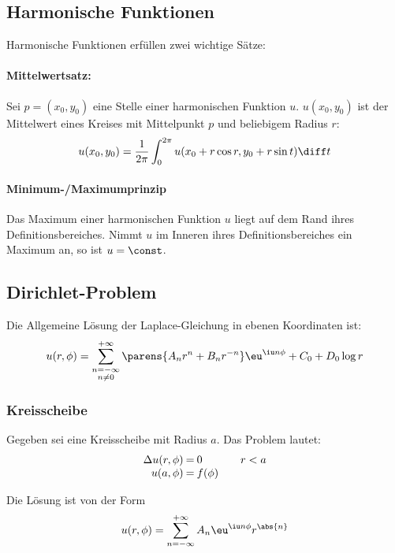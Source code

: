 	\subsection{Harmonische Funktionen} %
		Harmonische Funktionen erfüllen zwei wichtige Sätze:
		
		\paragraph{Mittelwertsatz:} %
			Sei $p = (x_0,y_0)$ eine Stelle einer harmonischen Funktion $u$.
			$u(x_0,y_0)$ ist der Mittelwert eines Kreises mit Mittelpunkt $p$ und
			beliebigem Radius $r$:
			\[
				u(x_0, y_0) = \frac{1}{2\pi} \int_0^{2\pi} u(x_0 + r\cos r, y_0 + r\sin t) \diff t
			\]
		
		\paragraph{Minimum-/Maximumprinzip} %
			Das Maximum einer harmonischen Funktion $u$ liegt auf dem Rand ihres
			Definitionsbereiches. Nimmt $u$ im Inneren ihres Definitionsbereiches
			ein Maximum an, so ist $u = \const$.
	\subsection{Dirichlet-Problem} %
		Die Allgemeine Lösung der Laplace-Gleichung in ebenen Koordinaten ist:
		\[
			u(r,\phi) = \sum_{\substack{n=-\infty\\ n\neq 0}}^{+\infty} \parens{
				A_n r^n + B_n r^{-n}
			} \eu^{\iu n \phi} + C_0 + D_0 \log r
		\]
		\subsubsection{Kreisscheibe} %
			Gegeben sei eine Kreisscheibe mit Radius $a$.
			Das Problem lautet:
			\begin{equation*}
				\begin{array}{r@{\:=\:}l@{\qquad}l}
					\Delta u(r,\phi) & 0 & r < a \\
					u(a,\phi) & f(\phi) & 
				\end{array}
			\end{equation*}

			Die Lösung ist von der Form
			\[
				u(r,\phi) = \sum_{n=-\infty}^{+\infty} A_n \eu^{\iu n \phi} r^{\abs{n}}
			\]

